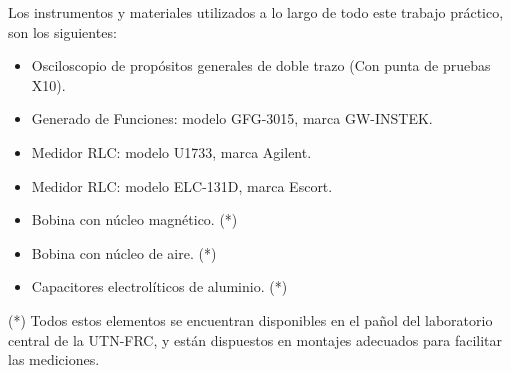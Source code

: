 
Los instrumentos y materiales utilizados a lo largo de todo este trabajo práctico, son los siguientes:

\begin{itemize}
    \item Osciloscopio de propósitos generales de doble trazo (Con punta de pruebas X10).
    \item Generado de Funciones: modelo GFG-3015, marca GW-INSTEK.
    \item Medidor RLC: modelo U1733, marca Agilent.
    \item Medidor RLC: modelo ELC-131D, marca Escort.
    \item Bobina con núcleo magnético. (*)
    \item Bobina con núcleo de aire. (*)
    \item Capacitores electrolíticos de aluminio. (*)
\end{itemize}

(*) Todos estos elementos se encuentran disponibles en el pañol del laboratorio central de la UTN-FRC, y
están dispuestos en montajes adecuados para facilitar las mediciones.